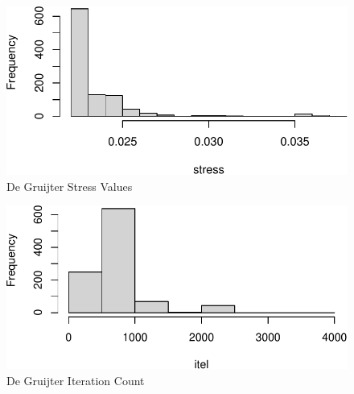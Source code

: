 \documentclass[
  12pt,
  letterpaper,
  DIV=11,
  numbers=noendperiod]{scrreprt}
\newenvironment{Shaded}{\begin{snugshade}}{\end{snugshade}}
\newcommand{\DecValTok}[1]{\textcolor[rgb]{0.68,0.00,0.00}{#1}}
\newcommand{\NormalTok}[1]{\textcolor[rgb]{0.00,0.23,0.31}{#1}}
\newcommand{\OtherTok}[1]{\textcolor[rgb]{0.00,0.23,0.31}{#1}}
\newcommand{\SpecialCharTok}[1]{\textcolor[rgb]{0.37,0.37,0.37}{#1}}
\theoremstyle{remark}
\begin{document}
\begin{figure}[H]

{\centering \includegraphics{global_files/figure-pdf/histgruijter1-1.pdf}

}

\caption{De Gruijter Stress Values}

\end{figure}%

\begin{figure}[H]

{\centering \includegraphics{global_files/figure-pdf/histgruijter2-1.pdf}

}

\caption{De Gruijter Iteration Count}

\end{figure}%

\begin{Shaded}
\end{Shaded}
\end{document}
